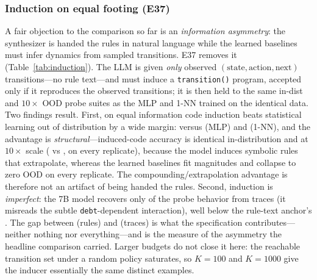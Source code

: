 \documentclass[11pt]{article}
\begin{document}
\subsubsection{Induction on equal footing (E37)}\label{sec:induction}
A fair objection to the comparison so far is an \emph{information asymmetry}:
the synthesizer is handed the rules in natural language while the learned
baselines must infer dynamics from sampled transitions. E37 removes it
(Table~\ref{tab:induction}). The LLM is given \emph{only} observed
$(\textrm{state},\textrm{action},\textrm{next})$ transitions---no rule
text---and must induce a \texttt{transition()} program, accepted only if it
reproduces the observed transitions; it is then held to the same in-dist and
$10\times$ OOD probe suites as the MLP and 1-NN trained on the identical
data. Two findings result. First, on equal information code
induction beats statistical learning out of distribution by a wide margin:
\IndTracesOod{} versus \IndMlpOod{} (MLP) and \IndKnnOod{} (1-NN), and the
advantage is \emph{structural}---induced-code accuracy is identical
in-distribution and at $10\times$ scale (\IndTracesIn{} vs \IndTracesOod, on
every replicate), because the model induces symbolic rules that extrapolate,
whereas the learned baselines fit magnitudes and collapse to zero OOD on
every replicate. The compounding/extrapolation advantage is therefore not an
artifact of being handed the rules. Second, induction is \emph{imperfect}:
the 7B model recovers only \IndTracesIn{} of the probe behavior from traces
(it misreads the subtle \texttt{debt}-dependent interaction), well below the
rule-text anchor's \IndRulesIn. The gap between \IndRulesIn{} (rules) and
\IndTracesIn{} (traces) is what the specification
contributes---neither nothing nor everything---and is the measure of
the asymmetry the headline comparison carried. Larger budgets do not close
it here: the reachable transition set under a random policy saturates, so
$K{=}100$ and $K{=}1000$ give the inducer essentially the same distinct
examples.

\begin{table}[htb]\centering\small

\caption{E37, equal-information induction: exact probe accuracy when the LLM
must induce dynamics from transitions alone (no rule text), against the MLP
and 1-NN on the same data, plus the rule-text synthesis anchor. Code
induction is imperfect but scale-invariant (in-dist $=$ OOD); the learned
baselines collapse out of distribution; the rules-vs-traces gap measures what
the specification buys.}
\label{tab:induction}
\end{table}
\end{document}
